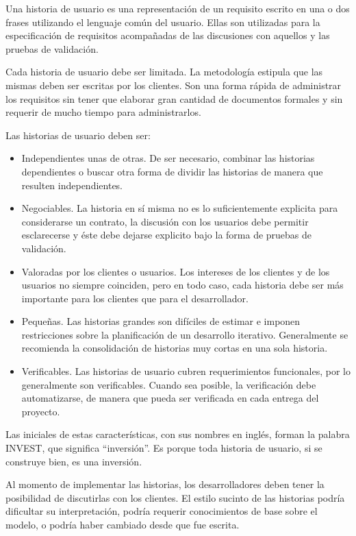 Una historia de usuario es una representación de un requisito escrito en una o dos frases utilizando el lenguaje común del usuario\citep{davis_agile_2015}. Ellas son utilizadas para la especificación de requisitos acompañadas de las discusiones con aquellos y las pruebas de validación.

Cada historia de usuario debe ser limitada. La metodología estipula que las mismas deben ser escritas por los clientes. Son una forma rápida de administrar los requisitos sin tener que elaborar gran cantidad de documentos formales y sin requerir de mucho tiempo para administrarlos.

Las historias de usuario deben ser:
\begin{itemize}
    \item Independientes unas de otras. De ser necesario, combinar las historias dependientes o buscar otra forma de dividir las historias de manera que resulten independientes.
    \item Negociables. La historia en sí misma no es lo suficientemente explicita para considerarse un contrato, la discusión con los usuarios debe permitir esclarecerse y éste debe dejarse explicito bajo la forma de pruebas de validación.
    \item Valoradas por los clientes o usuarios. Los intereses de los clientes y de los usuarios no siempre coinciden, pero en todo caso, cada historia debe ser más importante para los clientes que para el desarrollador.
    \item Pequeñas. Las historias grandes son difíciles de estimar e imponen restricciones sobre la planificación de un desarrollo iterativo. Generalmente se recomienda la consolidación de historias muy cortas en una sola historia.
    \item Verificables. Las historias de usuario cubren requerimientos funcionales, por lo generalmente son verificables. Cuando sea posible, la verificación debe automatizarse, de manera que pueda ser verificada en cada entrega del proyecto.
\end{itemize}

Las iniciales de estas características, con sus nombres en inglés, forman la palabra INVEST, que significa “inversión”. Es porque toda historia de usuario, si se construye bien, es una inversión.

Al momento de implementar las historias, los desarrolladores deben tener la posibilidad de discutirlas con los clientes. El estilo sucinto de las historias podría dificultar su interpretación, podría requerir conocimientos de base sobre el modelo, o podría haber cambiado desde que fue escrita.


